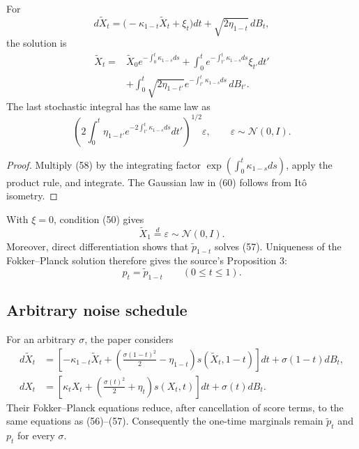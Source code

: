 \begin{lemma}
For
\begin{equation*}
 d\widetilde X_t=\bigl(-\kappa_{1-t}\widetilde X_t+\xi_t\bigr)dt
 +\sqrt{2\eta_{1-t}}\,dB_t,
 \tag{58}
\end{equation*}
the solution is
\begin{align*}
 \widetilde X_t={}&\widetilde X_0e^{-\int_0^t\kappa_{1-s}ds}
 +\int_0^te^{-\int_{t'}^t\kappa_{1-s}ds}\xi_{t'}dt'\\
 &+\int_0^t\sqrt{2\eta_{1-t'}}e^{-\int_{t'}^t\kappa_{1-s}ds}\,dB_{t'}.
 \tag{59}
\end{align*}
The last stochastic integral has the same law as
\[
 \left(
 2\int_0^t\eta_{1-t'}e^{-2\int_{t'}^t\kappa_{1-s}ds}dt'
 \right)^{1/2}\varepsilon,
 \qquad \varepsilon\sim\mathcal N(0,I).
 \tag{60}
\]
\end{lemma}
\begin{proof}
Multiply (58) by the integrating factor
$\exp(\int_0^t\kappa_{1-s}ds)$, apply the product rule, and integrate.  The Gaussian law in (60) follows from It\^o isometry.
\end{proof}

With $\xi=0$, condition (50) gives
\begin{equation*}
 \widetilde X_1\stackrel{d}{=}\varepsilon\sim\mathcal N(0,I).
 \tag{61}
\end{equation*}
Moreover, direct differentiation shows that $\widetilde p_{1-t}$ solves (57).  Uniqueness of the Fokker--Planck solution therefore gives the source's Proposition 3:
\begin{equation*}
 p_t=\widetilde p_{1-t}
 \qquad(0\le t\le 1).
 \tag{P3}
\end{equation*}

\subsection{Arbitrary noise schedule}
For an arbitrary $\sigma$, the paper considers
\begin{align*}
 d\widetilde X_t
 &=\left[-\kappa_{1-t}\widetilde X_t
 +\left(\frac{\sigma(1-t)^2}{2}-\eta_{1-t}\right)
 s(\widetilde X_t,1-t)\right]dt
 +\sigma(1-t)dB_t,
 \tag{63}\\
 dX_t
 &=\left[\kappa_tX_t+
 \left(\frac{\sigma(t)^2}{2}+\eta_t\right)s(X_t,t)\right]dt
 +\sigma(t)dB_t.
 \tag{64}
\end{align*}
Their Fokker--Planck equations reduce, after cancellation of score terms, to the same equations as (56)--(57).  Consequently the one-time marginals remain $\widetilde p_t$ and $p_t$ for every $\sigma$.

